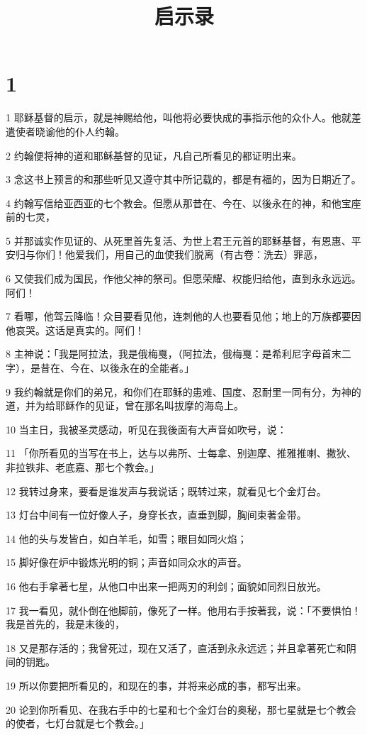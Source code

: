 

\title{启示录}


\chapter{1}

\par 1 耶稣基督的启示，就是神赐给他，叫他将必要快成的事指示他的众仆人。他就差遣使者晓谕他的仆人约翰。
\par 2 约翰便将神的道和耶稣基督的见证，凡自己所看见的都证明出来。
\par 3 念这书上预言的和那些听见又遵守其中所记载的，都是有福的，因为日期近了。
\par 4 约翰写信给亚西亚的七个教会。但愿从那昔在、今在、以後永在的神，和他宝座前的七灵，
\par 5 并那诚实作见证的、从死里首先复活、为世上君王元首的耶稣基督，有恩惠、平安归与你们！他爱我们，用自己的血使我们脱离（有古卷：洗去）罪恶，
\par 6 又使我们成为国民，作他父神的祭司。但愿荣耀、权能归给他，直到永永远远。阿们！
\par 7 看哪，他驾云降临！众目要看见他，连刺他的人也要看见他；地上的万族都要因他哀哭。这话是真实的。阿们！
\par 8 主神说：「我是阿拉法，我是俄梅戛，（阿拉法，俄梅戛：是希利尼字母首末二字），是昔在、今在、以後永在的全能者。」
\par 9 我约翰就是你们的弟兄，和你们在耶稣的患难、国度、忍耐里一同有分，为神的道，并为给耶稣作的见证，曾在那名叫拔摩的海岛上。
\par 10 当主日，我被圣灵感动，听见在我後面有大声音如吹号，说：
\par 11 「你所看见的当写在书上，达与以弗所、士每拿、别迦摩、推雅推喇、撒狄、非拉铁非、老底嘉、那七个教会。」
\par 12 我转过身来，要看是谁发声与我说话；既转过来，就看见七个金灯台。
\par 13 灯台中间有一位好像人子，身穿长衣，直垂到脚，胸间束著金带。
\par 14 他的头与发皆白，如白羊毛，如雪；眼目如同火焰；
\par 15 脚好像在炉中锻炼光明的铜；声音如同众水的声音。
\par 16 他右手拿著七星，从他口中出来一把两刃的利剑；面貌如同烈日放光。
\par 17 我一看见，就仆倒在他脚前，像死了一样。他用右手按著我，说：「不要惧怕！我是首先的，我是末後的，
\par 18 又是那存活的；我曾死过，现在又活了，直活到永永远远；并且拿著死亡和阴间的钥匙。
\par 19 所以你要把所看见的，和现在的事，并将来必成的事，都写出来。
\par 20 论到你所看见、在我右手中的七星和七个金灯台的奥秘，那七星就是七个教会的使者，七灯台就是七个教会。」

